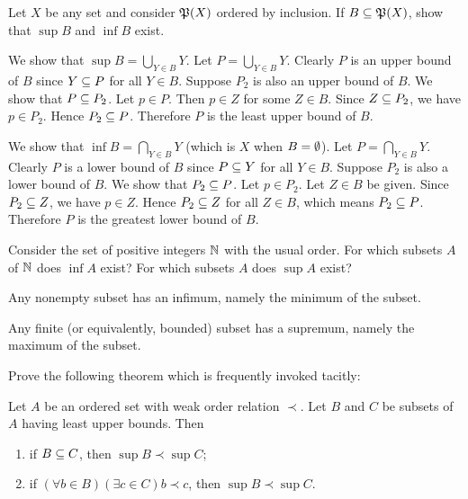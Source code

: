 \begin{exercise}
Let $X$ be any set and consider $\operatorname{\mathfrak{P}}(X)$ ordered by inclusion. If $B\subseteq\operatorname{\mathfrak{P}}(X)$, show that
$\sup B$ and $\inf B$ exist.
\end{exercise}

\begin{solution}
We show that $\sup B = \bigcup_{Y\in B} Y$. Let $P=\bigcup_{Y\in B} Y$.
Clearly $P$ is an upper bound of $B$ since $Y\subseteq P$ for all $Y\in B$.
Suppose $P_2$ is also an upper bound of $B$. We show that $P\subseteq P_2$.
Let $p\in P$. Then $p\in Z$ for some
$Z\in B$. Since $Z\subseteq P_2$, we have $p\in P_2$. Hence $P_2\subseteq P$.
Therefore $P$ is the least upper bound of $B$.

We show that $\inf B = \bigcap_{Y\in B}Y$ (which is $X$ when $B=\emptyset$).
Let $P=\bigcap_{Y\in B} Y$.
Clearly $P$ is a lower bound of $B$ since $P\subseteq Y$ for all $Y\in B$.
Suppose $P_2$ is also a lower bound of $B$. We show that $P_2\subseteq P$.
Let $p\in P_2$. Let $Z\in B$ be given. Since $P_2\subseteq Z$, we have $p\in Z$.
Hence $P_2\subseteq Z$ for all $Z\in B$, which means $P_2\subseteq P$.
Therefore $P$ is the greatest lower bound of $B$.
\end{solution}

\begin{exercise}
Consider the set of positive integers $\mathbb{N}$ with the usual order. For which subsets
$A$ of $\mathbb{N}$ does $\inf A$ exist? For which subsets $A$ does $\sup A$ exist?
\end{exercise}

\begin{solution}
Any nonempty subset has an infimum, namely the minimum of the subset.

Any finite (or equivalently, bounded) subset has a supremum, namely the maximum of the subset.
\end{solution}

\begin{exercise}
Prove the following theorem which is frequently invoked tacitly:

Let $A$ be an ordered set with weak order relation $\prec$. Let $B$ and $C$ be subsets of $A$
having least upper bounds. Then
\begin{enumerate}[label=(\roman*)]
    \item if $B\subseteq C$, then $\sup B \prec \sup C$;
    \item if $(\forall b\in B)(\exists c\in C)b\prec c$, then $\sup B\prec\sup C$.
\end{enumerate}
\end{exercise}

